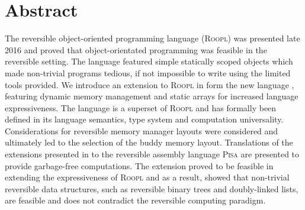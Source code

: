 \chapter*{Abstract}

The reversible object-oriented programming language (\textsc{Roopl}) was presented late 2016 and proved that object-orientated programming was feasible in the reversible setting. The language featured simple statically scoped objects which made non-trivial programs tedious, if not impossible to write using the limited tools provided.
We introduce an extension to \textsc{Roopl} in form the new language \rooplpp, featuring dynamic memory management and static arrays for increased language expressiveness. The language is a superset of \textsc{Roopl} and has formally been defined in its language semantics, type system and computation universality. Considerations for reversible memory manager layouts were considered and ultimately led to the selection of the buddy memory layout. Translations of the extensions presented in \rooplpp to the reversible assembly language \textsc{Pisa} are presented to provide garbage-free computations. The extension proved to be feasible in extending the expressiveness of \textsc{Roopl} and as a result, showed that non-trivial reversible data structures, such as reversible binary trees and doubly-linked lists, are feasible and does not contradict the reversible computing paradigm.